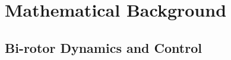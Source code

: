 \chapter{Mathematical Background}
\label{chp:background}


\section{Bi-rotor Dynamics and Control}
\label{sec:dynamics}

